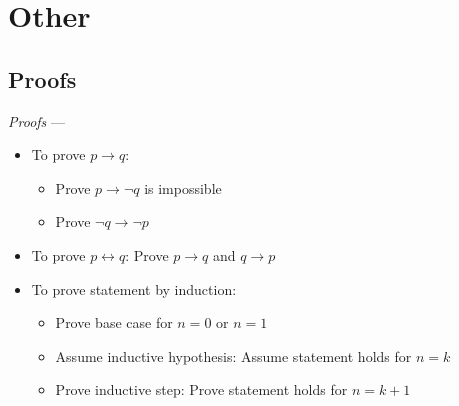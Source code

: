 \section{Other}
\subsection*{Proofs}

\emph{Proofs} --- 
\begin{itemize}
    \item To prove $p \rightarrow q$:
    \begin{itemize}
        \item Prove $p \rightarrow \neg q$ is impossible
        \item Prove $\neg q \rightarrow \neg p$
    \end{itemize}
    \item To prove $p \leftrightarrow q$: Prove $p \rightarrow q$ and $q \rightarrow p$
    \item To prove statement by induction: 
    \begin{itemize}
        \item Prove base case for $n=0$ or $n=1$
        \item Assume inductive hypothesis: Assume statement holds for $n=k$
        \item Prove inductive step: Prove statement holds for $n=k+1$
    \end{itemize}
\end{itemize}